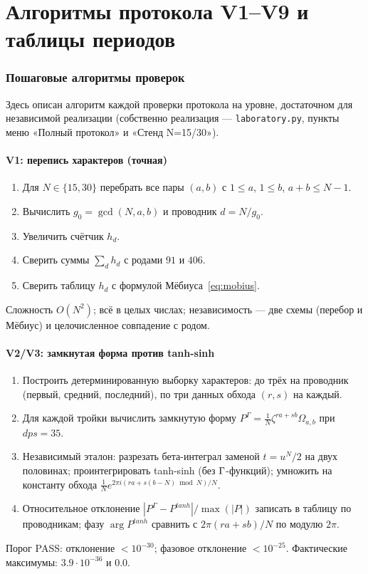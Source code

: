 \part{Алгоритмы протокола V1--V9 и таблицы периодов}

\section{Пошаговые алгоритмы проверок}\label{sec:algoV}

Здесь описан алгоритм каждой проверки протокола на уровне,
достаточном для независимой реализации (собственно реализация ---
\texttt{laboratory.py}, пункты меню «Полный протокол» и «Стенд
N=15/30»).

\subsection{V1: перепись характеров (точная)}

\begin{enumerate}[leftmargin=2em, itemsep=0.1em]
\item Для $N\in\{15,30\}$ перебрать все пары $(a,b)$ с
  $1\le a$, $1\le b$, $a+b\le N-1$.
\item Вычислить $g_0=\gcd(N,a,b)$ и проводник $d=N/g_0$.
\item Увеличить счётчик $h_d$.
\item Сверить суммы $\sum_d h_d$ с родами $91$ и $406$.
\item Сверить таблицу $h_d$ с формулой Мёбиуса~\eqref{eq:mobius}.
\end{enumerate}
Сложность $O(N^2)$; всё в целых числах; независимость --- две схемы
(перебор и Мёбиус) и целочисленное совпадение с родом.

\subsection{V2/V3: замкнутая форма против tanh-sinh}

\begin{enumerate}[leftmargin=2em, itemsep=0.1em]
\item Построить детерминированную выборку характеров: до трёх на
  проводник (первый, средний, последний), по три данных обхода
  $(r,s)$ на каждый.
\item Для каждой тройки вычислить замкнутую форму
  $P^{\Gamma}=\frac1N\zeta^{ra+sb}\Omega_{a,b}$ при $dps=35$.
\item Независимый эталон: разрезать бета-интеграл заменой
  $t=u^N/2$ на двух половинах; проинтегрировать tanh-sinh
  (без $\Gamma$-функций); умножить на константу обхода
  $\frac1N e^{2\pi i(ra+s(b-N)\bmod N)/N}$.
\item Относительное отклонение $|P^\Gamma-P^{tanh}|/\max(|P|)$
  записать в таблицу по проводникам; фазу $\arg P^{tanh}$ сравнить
  с $2\pi(ra+sb)/N$ по модулю $2\pi$.
\end{enumerate}
Порог PASS: отклонение $<10^{-30}$; фазовое отклонение $<10^{-25}$.
Фактические максимумы: $3.9\cdot10^{-36}$ и $0.0$.

